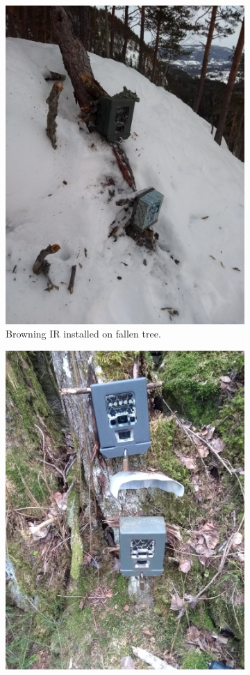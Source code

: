 
\begin{figure}
		\begin{subfigure}{.5\textwidth}
		  \centering
		  	\includegraphics[width=.8\linewidth]{./img/cam_install_example/IMG_20190212_161615169.jpg}
		  \caption{Browning IR installed on fallen tree.}
		  	\label{fig:cam_ex_a}
	\end{subfigure}
		\begin{subfigure}{.5\textwidth}
		  \centering
		  	\includegraphics[width=.8\linewidth]{./img/cam_install_example/IMG_20190515_170952923.jpg}

\end{subfigure}
\end{figure}
